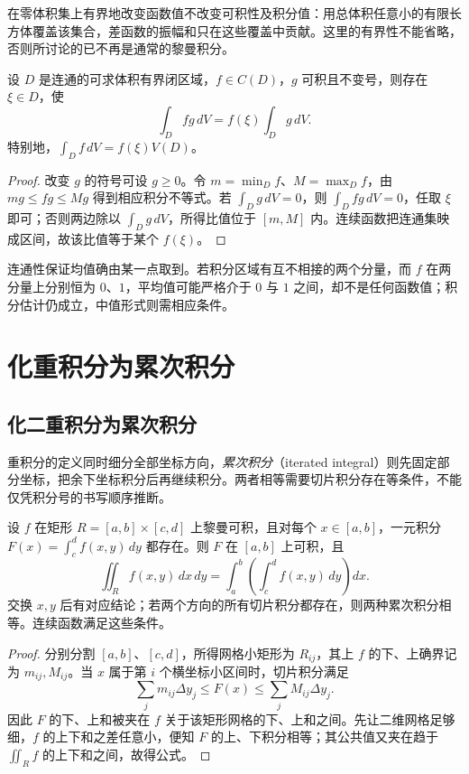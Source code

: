 \documentclass[UTF8,12pt,a4paper,fontset=fandol]{ctexbook}
\begin{document}
在零体积集上有界地改变函数值不改变可积性及积分值：用总体积任意小的有限长方体覆盖该集合，差函数的振幅和只在这些覆盖中贡献。这里的有界性不能省略，否则所讨论的已不再是通常的黎曼积分。

\begin{theorem}[重积分第一中值定理]
\label{thm:multiple-weighted-mean-value}
设 $D$ 是连通的可求体积有界闭区域，$f\in C(D)$，$g$ 可积且不变号，则存在 $\xi\in D$，使
\begin{equation}
    \int_Dfg\,dV=f(\xi)\int_Dg\,dV.
    \label{eq:multiple-weighted-mean-value}
\end{equation}
特别地，$\int_Df\,dV=f(\xi)V(D)$。
\end{theorem}
\begin{proof}
改变 $g$ 的符号可设 $g\geq0$。令 $m=\min_Df$、$M=\max_Df$，由 $mg\leq fg\leq Mg$ 得到相应积分不等式。若 $\int_Dg\,dV=0$，则 $\int_Dfg\,dV=0$，任取 $\xi$ 即可；否则两边除以 $\int_Dg\,dV$，所得比值位于 $[m,M]$ 内。连续函数把连通集映成区间，故该比值等于某个 $f(\xi)$。
\end{proof}

连通性保证均值确由某一点取到。若积分区域有互不相接的两个分量，而 $f$ 在两分量上分别恒为 $0$、$1$，平均值可能严格介于 $0$ 与 $1$ 之间，却不是任何函数值；积分估计仍成立，中值形式则需相应条件。

\section{化重积分为累次积分}
\label{sec:reduction-of-multiple-integrals-to-iterated-integrals}

\subsection{化二重积分为累次积分}
\label{subsec:reduction-of-double-integrals-to-iterated-integrals}

重积分的定义同时细分全部坐标方向，\emph{累次积分}（iterated integral）则先固定部分坐标，把余下坐标积分后再继续积分。两者相等需要切片积分存在等条件，不能仅凭积分号的书写顺序推断。

\begin{theorem}[矩形上的累次积分公式]
\label{thm:multiple-rectangle-fubini}
设 $f$ 在矩形 $R=[a,b]\times[c,d]$ 上黎曼可积，且对每个 $x\in[a,b]$，一元积分 $F(x)=\int_c^df(x,y)\,dy$ 都存在。则 $F$ 在 $[a,b]$ 上可积，且
\begin{equation}
    \iint_Rf(x,y)\,dx\,dy
    =\int_a^b\left(\int_c^df(x,y)\,dy\right)dx.
    \label{eq:multiple-rectangle-fubini}
\end{equation}
交换 $x,y$ 后有对应结论；若两个方向的所有切片积分都存在，则两种累次积分相等。连续函数满足这些条件。
\end{theorem}
\begin{proof}
分别分割 $[a,b]$、$[c,d]$，所得网格小矩形为 $R_{ij}$，其上 $f$ 的下、上确界记为 $m_{ij},M_{ij}$。当 $x$ 属于第 $i$ 个横坐标小区间时，切片积分满足
\[
    \sum_jm_{ij}\Delta y_j\leq F(x)
    \leq\sum_jM_{ij}\Delta y_j.
\]
因此 $F$ 的下、上和被夹在 $f$ 关于该矩形网格的下、上和之间。先让二维网格足够细，$f$ 的上下和之差任意小，便知 $F$ 的上、下积分相等；其公共值又夹在趋于 $\iint_Rf$ 的上下和之间，故得公式。
\end{proof}
\end{document}
